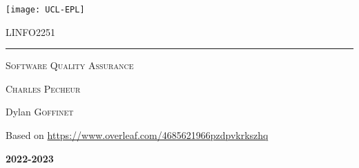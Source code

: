 \documentclass{customSynthesis}
\begin{document}

\begin{titlepage}
	\flushleft\texttt{[image: UCL-EPL]}\\
	\vspace*{2cm}
	\vspace*{\fill}
	\centering
	{\scshape\LARGE LINFO2251 \par}
	\vspace{0.4cm}
	{\color{clearBlue}\rule{0.7\textwidth}{1pt}\par}
	\vspace{0.5cm}
	{\scshape\Large Software Quality Assurance \par}
	\vspace{0.5cm}
	{\scshape\large Charles Pecheur\par}
	\vspace{1cm}
	{\scshape\large  \par} %
	{\Large\itshape\par}
	\vspace*{\fill}
	\vfill
	\vfill
	{\Large Dylan \textsc{Goffinet}\par}
	\vspace{0.2cm}
	{\small Based on \url{https://www.overleaf.com/4685621966pzdpvkrkszhq}\par}
	\vspace{0.5cm}
	{\Large\bfseries 2022-2023\par}
	{\large \par}
\end{titlepage}


\setcounter{tocdepth}{1} %
\tableofcontents
\thispagestyle{empty} %
\clearpage
{}




\end{document}
